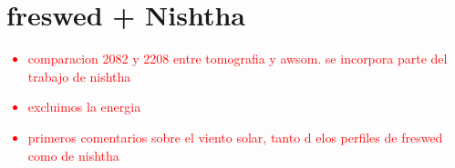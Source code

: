 \chapter{freswed + Nishtha}
\textcolor{red}{
\begin{itemize}
  \item comparacion 2082 y 2208 entre tomografia y awsom. se incorpora parte del trabajo de nishtha
  \item excluimos la energia
  \item primeros comentarios sobre el viento solar, tanto d elos perfiles de freswed como de nishtha
\end{itemize}
}

